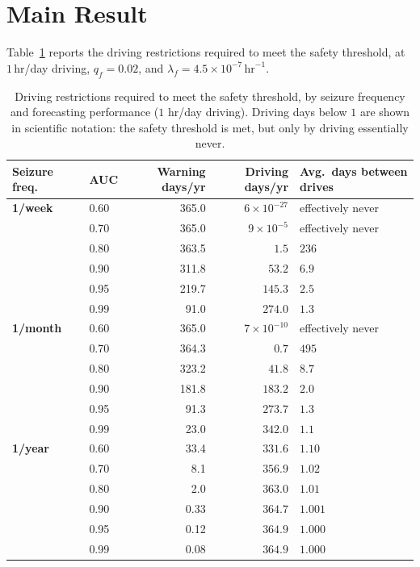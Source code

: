 \documentclass[11pt]{article}
\numberwithin{equation}{section}
\begin{document}
\section{Main Result}
\label{sec:main-result}

Table~\ref{tab:main} reports the driving restrictions required to meet the safety
threshold, at $1$\,hr/day driving, $q_f = 0.02$, and
$\lambda_f = 4.5\times 10^{-7}\,\text{hr}^{-1}$.

\begin{table}[htbp]
\caption{Driving restrictions required to meet the safety threshold, by seizure
frequency and forecasting performance ($1$ hr/day driving). Driving days below $1$ are
shown in scientific notation: the safety threshold is met, but only by driving
essentially never.}
\label{tab:main}
\centering
\small
\begin{tabular}{llrrl}
\toprule
Seizure freq.\ & AUC & Warning days/yr & Driving days/yr & Avg.\ days between drives \\
\midrule
\textbf{1/week}  & 0.60 & 365.0 & $6\times10^{-27}$ & effectively never \\
                 & 0.70 & 365.0 & $9\times10^{-5}$  & effectively never \\
                 & 0.80 & 363.5 & $1.5$   & $236$ \\
                 & 0.90 & 311.8 & $53.2$  & $6.9$ \\
                 & 0.95 & 219.7 & $145.3$ & $2.5$ \\
                 & 0.99 & 91.0  & $274.0$ & $1.3$ \\
\midrule
\textbf{1/month} & 0.60 & 365.0 & $7\times10^{-10}$ & effectively never \\
                 & 0.70 & 364.3 & $0.7$   & $495$ \\
                 & 0.80 & 323.2 & $41.8$  & $8.7$ \\
                 & 0.90 & 181.8 & $183.2$ & $2.0$ \\
                 & 0.95 & 91.3  & $273.7$ & $1.3$ \\
                 & 0.99 & 23.0  & $342.0$ & $1.1$ \\
\midrule
\textbf{1/year}  & 0.60 & 33.4  & $331.6$ & $1.10$ \\
                 & 0.70 & 8.1   & $356.9$ & $1.02$ \\
                 & 0.80 & 2.0   & $363.0$ & $1.01$ \\
                 & 0.90 & 0.33  & $364.7$ & $1.001$ \\
                 & 0.95 & 0.12  & $364.9$ & $1.000$ \\
                 & 0.99 & 0.08  & $364.9$ & $1.000$ \\
\bottomrule
\end{tabular}
\end{table}
\end{document}

